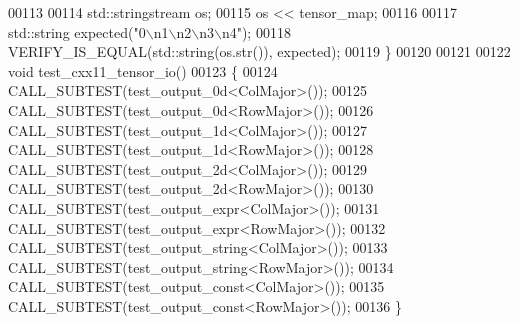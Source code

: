 \begin{DoxyCode}
00113 
00114   std::stringstream os;
00115   os << tensor\_map;
00116 
00117   std::string expected(\textcolor{stringliteral}{"0\(\backslash\)n1\(\backslash\)n2\(\backslash\)n3\(\backslash\)n4"});
00118   VERIFY\_IS\_EQUAL(std::string(os.str()), expected);
00119 \}
00120 
00121 
00122 \textcolor{keywordtype}{void} test\_cxx11\_tensor\_io()
00123 \{
00124   CALL\_SUBTEST(test\_output\_0d<ColMajor>());
00125   CALL\_SUBTEST(test\_output\_0d<RowMajor>());
00126   CALL\_SUBTEST(test\_output\_1d<ColMajor>());
00127   CALL\_SUBTEST(test\_output\_1d<RowMajor>());
00128   CALL\_SUBTEST(test\_output\_2d<ColMajor>());
00129   CALL\_SUBTEST(test\_output\_2d<RowMajor>());
00130   CALL\_SUBTEST(test\_output\_expr<ColMajor>());
00131   CALL\_SUBTEST(test\_output\_expr<RowMajor>());
00132   CALL\_SUBTEST(test\_output\_string<ColMajor>());
00133   CALL\_SUBTEST(test\_output\_string<RowMajor>());
00134   CALL\_SUBTEST(test\_output\_const<ColMajor>());
00135   CALL\_SUBTEST(test\_output\_const<RowMajor>());
00136 \}
\end{DoxyCode}
